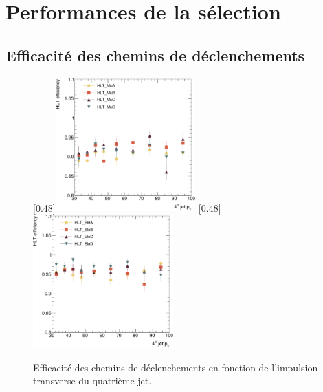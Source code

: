 \section{Performances de la sélection}

\subsection{Efficacité des chemins de déclenchements}

\begin{figure}[tbp] \centering
    [0.48\textwidth]{\includegraphics[width=0.48\textwidth]{chapitre7/figs/HLT/HLTturnon_mu_fourthJet_zoom.pdf}}
    [0.48\textwidth]{\includegraphics[width=0.48\textwidth]{chapitre7/figs/HLT/HLTturnon_el_fourthJet_zoom.pdf}}
    \caption{Efficacité des chemins de déclenchements en fonction de l'impulsion transverse du quatrième jet.}
    \label{fig:trig_eff}
\end{figure}


